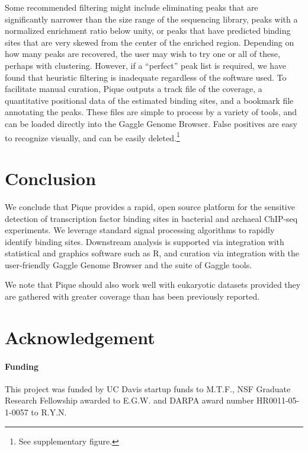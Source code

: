 \documentclass{bioinfo}
\begin{document}
Some recommended filtering might include eliminating peaks that are
significantly narrower than the size range of the sequencing library,
peaks with a normalized enrichment ratio below unity, or peaks that
have predicted binding sites that are very skewed from the center of
the enriched region. Depending on how many peaks are recovered, the
user may wish to try one or all of these, perhaps with
clustering. However, if a ``perfect'' peak list is required, we have
found that heuristic filtering is inadequate regardless of the
software used. To facilitate manual curation, Pique outputs a track
file of the coverage, a quantitative positional data of the estimated
binding sites, and a bookmark file annotating the peaks. These files
are simple to process by a variety of tools, and can be loaded
directly into the Gaggle Genome Browser. False positives are easy to
recognize visually, and can be easily deleted.\footnote{See
  supplementary figure.}

\section{Conclusion}

We conclude that Pique provides a rapid, open source platform for the
sensitive detection of transcription factor binding sites in bacterial
and archaeal ChIP-seq experiments. We leverage standard signal
processing algorithms to rapidly identify binding sites. Downstream
analysis is supported via integration with statistical and graphics
software such as R, and curation via integration with the
user-friendly Gaggle Genome Browser and the suite of Gaggle tools.

We note that Pique should also work well with eukaryotic datasets
provided they are gathered with greater coverage than has been
previously reported.

\section*{Acknowledgement}
\paragraph{Funding\textcolon} 

This project was funded by UC Davis startup funds to M.T.F., NSF Graduate
Research Fellowship awarded to E.G.W. and DARPA award number
HR0011-05-1-0057 to R.Y.N.


%
%
%
%

%


\end{document}
